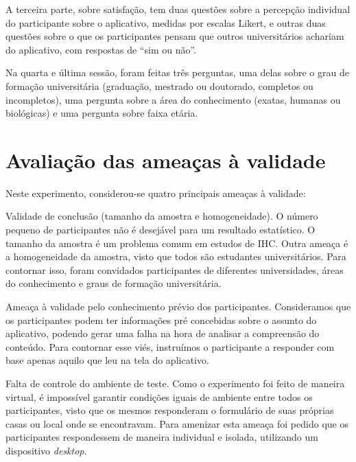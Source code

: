 \documentclass[12pt]{article}
\begin{document}
A terceira parte, sobre satisfação, tem duas questões sobre a percepção individual do participante sobre o aplicativo, medidas por escalas Likert, e outras duas questões sobre o que os participantes pensam que outros universitários achariam do aplicativo, com respostas de ``sim ou não''. 

Na quarta e última sessão, foram feitas três perguntas, uma delas sobre o grau de formação universitária (graduação, mestrado ou doutorado, completos ou incompletos), uma pergunta sobre a área do conhecimento (exatas, humanas ou biológicas) e uma pergunta sobre faixa etária.

\section{Avaliação das ameaças à validade}

Neste experimento, considerou-se quatro principais ameaças à validade: 

Validade de conclusão (tamanho da amostra e homogeneidade). O número pequeno de participantes não é desejável para um resultado estatístico. O tamanho da amostra é um problema comum em estudos de IHC. Outra ameaça é a homogeneidade da amostra, visto que todos são estudantes universitários. Para contornar isso, foram convidados participantes de diferentes universidades, áreas do conhecimento e graus de formação universitária.

Ameaça à validade pelo conhecimento prévio dos participantes. Consideramos que os participantes podem ter informações pré concebidas sobre o assunto do aplicativo, podendo gerar uma falha na hora de analisar a compreensão do conteúdo. Para contornar esse viés, instruímos o participante a responder com base apenas aquilo que leu na tela do aplicativo.

Falta de controle do ambiente de teste. Como o experimento foi feito de maneira virtual, é impossível garantir condições iguais de ambiente entre todos os participantes, visto que os mesmos responderam o formulário de suas próprias casas ou local onde se encontravam. Para amenizar esta ameaça foi pedido que os participantes respondessem de maneira individual e isolada, utilizando um dispositivo \textit{desktop}.



\end{document}
